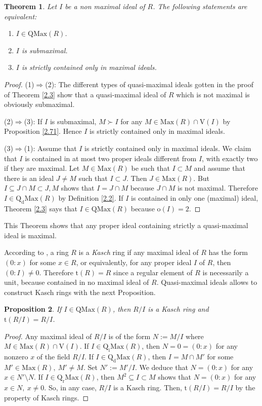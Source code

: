 \documentclass[12pt,leqno]{amsart}
\newtheorem{theorem}{Theorem}[section]
\newtheorem{proposition}[theorem]{Proposition}
\theoremstyle{definition}
\begin{document}
\begin{theorem}\label{2.6} Let $I$ be a non maximal ideal  of $R$. The following statements are equivalent:
\begin{enumerate}
\item $I\in\mathrm{QMax}(R)$.
\item $I$ is submaximal.
\item $I$ is strictly contained only in maximal ideals.
\end{enumerate} 
\end{theorem}
\begin{proof} (1)$\Rightarrow$(2): The different types of quasi-maximal ideals gotten in the proof of Theorem \ref{2.3} show that a quasi-maximal ideal of $R$ which is not maximal is obviously submaximal.

(2)$\Rightarrow$(3): If $I$ is submaximal, $M\succ I$ for any $M\in\mathrm {Max}(R)\cap\mathrm{V}(I)$ by Proposition \ref{2.71}. Hence $I$ is strictly contained only in maximal ideals.

(3)$\Rightarrow$(1): Assume that $I$ is strictly contained only in maximal ideals. We claim that $I$ is contained in at most two proper ideals different from $I$, with exactly two if they are maximal. Let $M\in\mathrm{Max}(R)$ be such that $I\subset M$ and assume that there is an ideal $J\neq M$ such that $I\subset J$. Then $J\in\mathrm{Max}(R)$. But $I\subseteq J\cap M\subset J,M$ shows that $I=J\cap M$ because $J\cap M$ is not maximal. Therefore $I\in\mathrm{Q_dMax}(R)$ by Definition \ref{2.2}. If $I$ is contained in only one (maximal) ideal, Theorem \ref{2.3} says that $I\in\mathrm{QMax}(R)$ because $\mathrm o(I)=2$.
 \end{proof}

This Theorem shows that any proper ideal containing strictly a quasi-maximal ideal is maximal. 

According to \cite[Corollary 8.28]{Lam}, a ring $R$ is a {\it Kasch} ring if any maximal ideal of $R$ has the form $(0:x)$ for some $x\in R$, or equivalently, for any proper ideal $I$ of $R$, then $(0:I)\neq 0$. Therefore $\mathrm{t}(R)=R$ since a regular element of $R$ is necessarily a unit, because contained in no maximal ideal of $R$.  Quasi-maximal ideals allows to construct Kasch rings with the next Proposition.

\begin{proposition}\label{2.8} If $I\in\mathrm{QMax}(R)$, then $R/I$ is a  Kasch ring and $\mathrm{t}(R/I)=R/I$. 
\end{proposition}
\begin{proof} Any maximal ideal of $R/I$ is of the form $N:=M/I$ where $M\in\mathrm{Max}(R)\cap\mathrm{V}(I) $. If $I\in\mathrm{Q_iMax}(R)$, then $N=0=(0:x)$ for any nonzero $x$ of the field $R/I$. If $I\in\mathrm {Q_dMax}(R)$, then $I=M\cap M'$ for some $M'\in\mathrm{Max}(R),\ M' \neq M$. Set $N':=M'/I$. We deduce that $N=(0:x)$ for any $x\in N' \setminus N$. If $I\in\mathrm{Q_rMax}(R)$, then $M^2\subseteq I\subset M$ shows that $N=(0:x)$ for any $x\in N,\ x\neq 0$. So, in any case, $R/I$ is a Kasch ring. Then, $\mathrm{t}(R/I)=R/I$ by the property of Kasch rings.
\end{proof}
 
\end{document}
